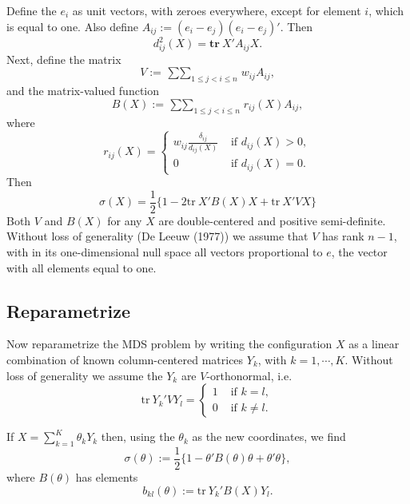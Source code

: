 \documentclass[
  12pt,
]{article}
\newcommand{\jis}{\mathop{\sum\sum}_{1\leq j<i\leq n}}
\begin{document}
Define the \(e_i\) as unit vectors, with zeroes everywhere, except for element \(i\), which is equal to one. Also define \(A_{ij}:=(e_i-e_j)(e_i-e_j)'\). Then
\begin{equation}
d_{ij}^2(X)=\mathbf{tr}\ X'A_{ij}X.
\label{eq:bmat}
\end{equation}
Next, define the matrix
\begin{equation}
V:=\jis w_{ij}A_{ij},
\label{eq:vdef}
\end{equation}
and the matrix-valued function
\begin{equation}
B(X):=\jis r_{ij}(X)A_{ij},
\label{eq:bdef}
\end{equation}
where
\begin{equation}
r_{ij}(X)=\begin{cases}w_{ij}\frac{\delta_{ij}}{d_{ij}(X)}&\text{ if }d_{ij}(X)>0,\\
0&\text{ if }d_{ij}(X)=0.\end{cases}
\label{eq:rdef}
\end{equation}
Then
\begin{equation}
\sigma(X)=\frac12\{1-2\text{tr}\ X'B(X)X+\text{tr}\ X'VX\}
\label{eq:lossmat}
\end{equation}
Both \(V\) and \(B(X)\) for any \(X\) are double-centered and positive semi-definite.
Without loss of generality (De Leeuw (1977)) we assume that \(V\) has rank \(n-1\),
with in its one-dimensional null space all vectors proportional to \(e\), the
vector with all elements equal to one.

\subsection{Reparametrize}\label{reparametrize}

Now reparametrize the MDS problem by writing the configuration \(X\) as a linear combination of known column-centered matrices \(Y_k\), with \(k=1,\cdots,K\). Without loss of generality we assume the \(Y_k\) are \(V\)-orthonormal, i.e.~
\begin{equation}
\text{tr}\ Y_k'VY_l=\begin{cases}1&\text{ if }k=l,\\
0&\text{ if }k\not= l.
\end{cases}
\label{eq:ortho}
\end{equation}

If \(X=\sum_{k=1}^K\theta_kY_k\) then,
using the \(\theta_k\) as the new coordinates, we find
\begin{equation}
\sigma(\theta):=\frac12\{1-\theta'B(\theta)\theta+\theta'\theta\},
\label{eq:losstheta}
\end{equation}
where \(B(\theta)\) has elements
\begin{equation}
b_{kl}(\theta):=\text{tr}\ Y_k'B(X)Y_l.
\label{eq:btheta}
\end{equation}
\end{document}
